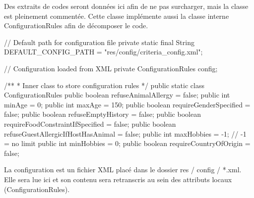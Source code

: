 \documentclass{mytex}
\begin{document}
Des extraits de codes seront données ici afin de ne pas surcharger, mais la classe est pleinement commentée. Cette classe implémente aussi la classe interne ConfigurationRules afin de décomposer le code. 


\begin{codebox}
// Default path for configuration file
private static final String DEFAULT_CONFIG_PATH = "res/config/criteria_config.xml";

// Configuration loaded from XML
private ConfigurationRules config;    	
\end{codebox}


\begin{codebox}
/**
* Inner class to store configuration rules
*/
public static class ConfigurationRules {
	public boolean refuseAnimalAllergy = false;
	public int minAge = 0;
	public int maxAge = 150;
	public boolean requireGenderSpecified = false;
	public boolean refuseEmptyHistory = false;
	public boolean requireFoodConstraintIfSpecified = false;
	public boolean refuseGuestAllergicIfHostHasAnimal = false;
	public int maxHobbies = -1; // -1 = no limit
	public int minHobbies = 0;
	public boolean requireCountryOfOrigin = false;
}
\end{codebox}


La configuration est un fichier XML placé dans le dossier res / config / *.xml. Elle sera lue ici et son contenu sera retranscris au sein des attributs locaux (ConfigurationRules).
\end{document}
